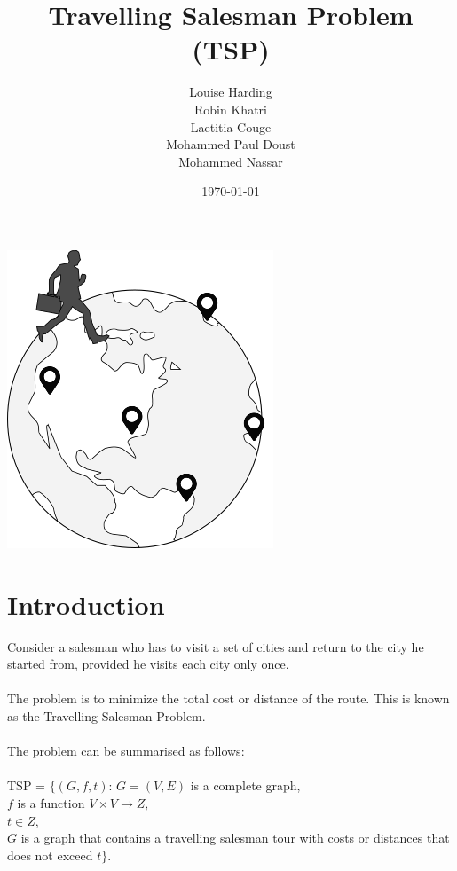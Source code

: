 \documentclass[11pt, english]{article}
\title{{\bf Travelling Salesman Problem (TSP)}}
\author{Louise Harding \\ Robin Khatri \\ Laetitia Couge\\ Mohammed Paul Doust \\ Mohammed Nassar}
\date{\today}
\begin{document}
\newcommand\tab[1][1.2cm]{\hspace*{#1}}

\begin{titlingpage}
\maketitle
\center \includegraphics[scale=0.5]{tsp.png}

\end{titlingpage}
\tableofcontents
\newpage

\section{Introduction}

Consider a salesman who has to visit a set of cities and return to the city he started from, provided he visits each city only once.\\
\\
\noindent
The problem is to minimize the total cost or distance of the route. This is known as the Travelling Salesman Problem.\\
\\
\noindent
The problem can be summarised as follows: \\
\\
\tab TSP = $\{(G,f,t)$: $G = (V,E)$ is a complete graph,\\
\tab \tab $f$ is a function $V\times V \rightarrow Z,$\\
\tab \tab $t \in Z,$ \\
\tab \tab $G$ is a graph that contains a travelling salesman tour with costs or distances that\\ \tab \tab does not exceed $t\}$.
\end{document}
